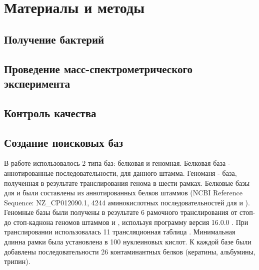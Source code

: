 \section{Материалы и методы}

\subsection{Получение бактерий}

\subsection{Проведение масс-спектрометрического эксперимента}

\subsection{Контроль качества}

\subsection{Создание поисковых баз}
В работе использовалось 2 типа баз: белковая и геномная. Белковая база - аннотированные последовательности, для данного штамма. Геноманя - база, полученная в результате транслирования генома в шести рамках.
Белковые базы для  и  были составлены из аннотированных белков штаммов (NCBI Reference Sequence: NZ\_CP012090.1, 4244 аминокислотных последовательностей для  и ).
Геномные базы были получены в результате 6 рамочного транслирования от стоп- до стоп-каднона геномов штаммов  и , используя программу  версия 16.0.0 \cite{rutherford2000artemis}. При транслировании использовалась 11 трансляционная таблица . Минимальная длинна рамки была установлена в 100 нуклеиновых кислот.
К каждой базе были добавлены последовательности 26 контаминантных белков (кератины, альбумины, трипин).

